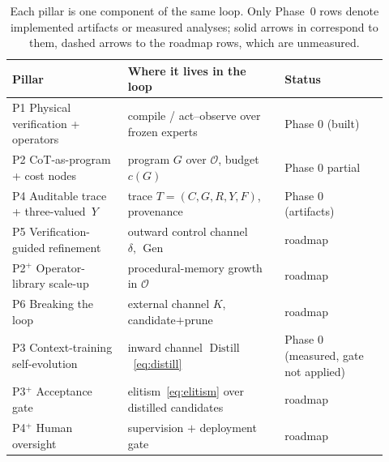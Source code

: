 \begin{table}[t]
\centering
\small
\begin{tabular}{@{}p{0.29\linewidth} p{0.38\linewidth} p{0.25\linewidth}@{}}
\toprule
\textbf{Pillar} & \textbf{Where it lives in the loop} & \textbf{Status} \\
\midrule
P1 Physical verification + operators & compile / act--observe over frozen experts~\cite{sam3_2025,flexsed2025} & Phase 0 (built) \\
P2 CoT-as-program + cost nodes & program $G$ over $\mathcal{O}$, budget $c(G)$ & Phase 0 partial \\
P4 Auditable trace + three-valued~$Y$ & trace $T=(C,G,R,Y,F)$, provenance & Phase 0 (artifacts) \\
P5 Verification-guided refinement & outward control channel $\delta,\,\operatorname{Gen}$ & roadmap \\
P2$^{+}$ Operator-library scale-up & procedural-memory growth in $\mathcal{O}$ & roadmap \\
P6 Breaking the loop & external channel $K$, candidate$+$prune & roadmap \\
P3 Context-training self-evolution & inward channel $\operatorname{Distill}$~\eqref{eq:distill} & Phase 0 (measured, gate not applied) \\
P3$^{+}$ Acceptance gate & elitism~\eqref{eq:elitism} over distilled candidates & roadmap \\
P4$^{+}$ Human oversight & supervision $+$ deployment gate & roadmap \\
\bottomrule
\end{tabular}
\caption{Each pillar is one component of the same loop. Only
Phase~0 rows denote implemented artifacts or measured analyses; solid arrows in 
correspond to them, dashed arrows to the roadmap rows, which are unmeasured.}
\label{tab:builtvsroadmap}
\end{table}

